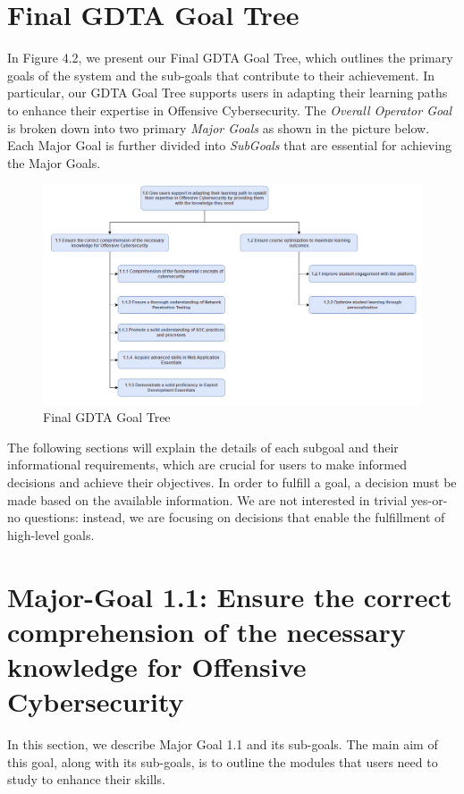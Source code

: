 \newpage
\section{Final GDTA Goal Tree}
In Figure 4.2, we present our Final GDTA Goal Tree, which outlines the primary goals of the system and the sub-goals that contribute to their achievement. In particular, our GDTA Goal Tree supports users in adapting their learning paths to enhance their expertise in Offensive Cybersecurity.
The \textit{Overall Operator Goal} is broken down into two primary \textit{Major Goals} as shown in the picture below. Each Major Goal is further divided into \textit{SubGoals} that are essential for achieving the Major Goals. 

\begin{figure}[H]
    \centering
    \includegraphics[width=\textwidth]{./assets/GDTA.png}
    \caption{Final GDTA Goal Tree}
    \label{fig:GDTA}
\end{figure}

The following sections will explain the details of each subgoal and their informational requirements, which are crucial for users to make informed decisions and achieve their objectives.
In order to fulfill a goal, a decision must be made based on the available information. We are not interested in trivial yes-or-no questions: instead, we are focusing on decisions that enable the fulfillment of high-level goals.

\newpage
\section{Major-Goal 1.1: Ensure the correct comprehension of the necessary knowledge for Offensive Cybersecurity}
In this section, we describe Major Goal 1.1 and its sub-goals.
The main aim of this goal, along with its sub-goals, is to outline the modules that users need to study to enhance their skills.

